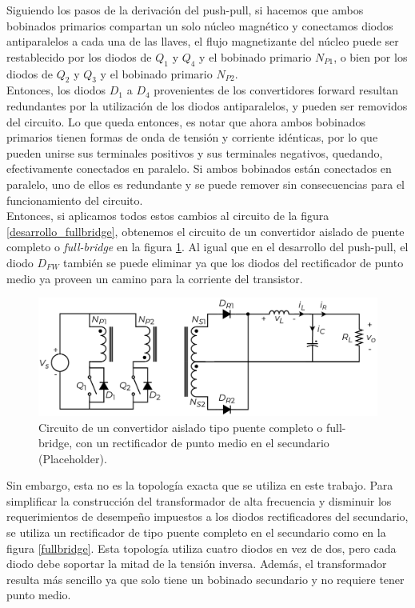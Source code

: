Siguiendo los pasos de la derivación del push-pull, si hacemos que ambos bobinados primarios compartan un solo núcleo magnético y conectamos diodos antiparalelos a cada una de las llaves, el flujo magnetizante del núcleo puede ser restablecido por los diodos de $Q_1$ y $Q_4$ y el bobinado primario $N_{P1}$, o bien por los diodos de $Q_2$ y $Q_3$ y el bobinado primario $N_{P2}$.\\

Entonces, los diodos $D_1$ a $D_4$ provenientes de los convertidores forward resultan redundantes por la utilización de los diodos antiparalelos, y pueden ser removidos del circuito. Lo que queda entonces, es notar que ahora ambos bobinados primarios tienen formas de onda de tensión y corriente idénticas, por lo que pueden unirse sus terminales positivos y sus terminales negativos, quedando, efectivamente conectados en paralelo. Si ambos bobinados están conectados en paralelo, uno de ellos es redundante y se puede remover sin consecuencias para el funcionamiento del circuito.\\

Entonces, si aplicamos todos estos cambios al circuito de la figura \ref{desarrollo_fullbridge}, obtenemos el circuito de un {\Medium convertidor aislado de puente completo} o {\Medium \textit{full-bridge}} en la figura \ref{fullbridge_partido}. Al igual que en el desarrollo del push-pull, el diodo $D_{FW}$ también se puede eliminar ya que los diodos del rectificador de punto medio ya proveen un camino para la corriente del transistor.\\

\begin{figure}[h]
    \centering
    \includegraphics[scale=0.6]{Imagenes/Push-Pull.pdf}
    \caption{Circuito de un convertidor aislado tipo puente completo o full-bridge, con un rectificador de punto medio en el secundario (Placeholder).}
    \label{fullbridge_partido}
\end{figure}

Sin embargo, esta no es la topología exacta que se utiliza en este trabajo. Para simplificar la construcción del transformador de alta frecuencia y disminuir los requerimientos de desempeño impuestos a los diodos rectificadores del secundario, se utiliza un {\Medium rectificador de tipo puente completo} en el secundario como en la figura \ref{fullbridge}. Esta topología utiliza cuatro diodos en vez de dos, pero cada diodo debe soportar la mitad de la tensión inversa. Además, el transformador resulta más sencillo ya que solo tiene un bobinado secundario y no requiere tener punto medio.\\

